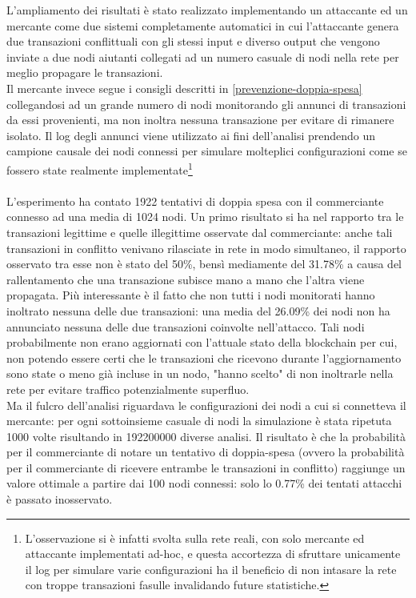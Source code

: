 L'ampliamento dei risultati è stato realizzato implementando un attaccante ed un mercante come due sistemi completamente automatici in cui l'attaccante genera due transazioni conflittuali con gli stessi input e diverso output che vengono inviate a due nodi aiutanti collegati ad un numero casuale di nodi nella rete per meglio propagare le transazioni.\\
Il mercante invece segue i consigli descritti in \ref{prevenzione-doppia-spesa} collegandosi ad un grande numero di nodi monitorando gli annunci di transazioni da essi provenienti, ma non inoltra nessuna transazione per evitare di rimanere isolato. Il log degli annunci viene utilizzato ai fini dell'analisi prendendo un campione causale dei nodi connessi per simulare molteplici configurazioni come se fossero state realmente implementate\footnote{L'osservazione si è infatti svolta sulla rete reali, con solo mercante ed attaccante implementati ad-hoc, e questa accortezza di sfruttare unicamente il log per simulare varie configurazioni ha il beneficio di non intasare la rete con troppe transazioni fasulle invalidando future statistiche.}\\\\
L'esperimento ha contato 1922 tentativi di doppia spesa con il commerciante connesso ad una media di 1024 nodi. Un primo risultato si ha nel rapporto tra le transazioni legittime e quelle illegittime osservate dal commerciante: anche tali transazioni in conflitto venivano rilasciate in rete in modo simultaneo, il rapporto osservato tra esse non è stato del 50\%, bensì mediamente del 31.78\% a causa del rallentamento che una transazione subisce mano a mano che l'altra viene propagata. Più interessante è il fatto che non tutti i nodi monitorati hanno inoltrato nessuna delle due transazioni: una media del 26.09\% dei nodi non ha annunciato nessuna delle due transazioni coinvolte nell'attacco. Tali nodi probabilmente non erano aggiornati con l'attuale stato della blockchain per cui, non potendo essere certi che le transazioni che ricevono durante l'aggiornamento sono state o meno già incluse in un nodo, "hanno scelto" di non inoltrarle nella rete per evitare traffico potenzialmente superfluo.\\
Ma il fulcro dell'analisi riguardava le configurazioni dei nodi a cui si connetteva il mercante: per ogni sottoinsieme casuale di nodi la simulazione è stata ripetuta 1000 volte risultando in 192200000 diverse analisi. Il risultato è che la probabilità per il commerciante di notare un tentativo di doppia-spesa (ovvero la probabilità per il commerciante di ricevere entrambe le transazioni in conflitto) raggiunge un valore ottimale a partire dai 100 nodi connessi: solo lo 0.77\% dei tentati attacchi è passato inosservato.\\
